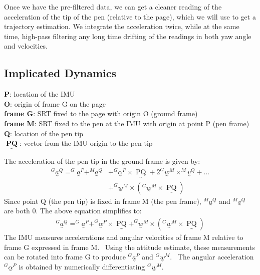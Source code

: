 \documentclass{article}
\newcommand{\nosymbol}{}
\newcommand{\tmop}[1]{\ensuremath{\operatorname{#1}}}
\begin{document}
Once we have the pre-filtered data, we can get a cleaner reading of the acceleration of the tip of the pen (relative to the page), which we will use to get a trajectory estimation. We integrate the acceleration twice, while at the same time, high-pass filtering any long time drifting of the readings in both yaw angle and velocities.


\subsection{Implicated Dynamics}
\textbf{P}: location of the IMU \\
\textbf{O}: origin of frame G on the page \\
\textbf{frame G}: SRT fixed to the page with origin O (ground frame) \\
\textbf{frame M}: SRT fixed to the pen at the IMU with origin at point P (pen frame) \\
\textbf{Q}: location of the pen tip \\
$\underset{\mbox{\textasciitilde}}{\tmop{\textbf{PQ}}}$: vector from the IMU origin to
the pen tip

The acceleration of the pen tip in the ground frame is given by:
\begin{align*}
  ^G \underset{\mbox{\textasciitilde}}{a}^Q =^G
  \underset{\mbox{\textasciitilde}}{a}^P +^M
  \underset{\mbox{\textasciitilde}}{a}^Q &+^G
  \underset{\mbox{\textasciitilde}}{\alpha}^P \times
  \underset{\mbox{\textasciitilde}}{\tmop{PQ}} + 2^G
  \underset{\mbox{\textasciitilde}}{w}^M \times^M
  \underset{\mbox{\textasciitilde}}{v}^Q + ... \\ &+ ^G 
  \underset{\mbox{\textasciitilde}}{w}^M \times \left(^G
  \underset{\mbox{\textasciitilde}}{w}^M \times
  \underset{\mbox{\textasciitilde}}{\tmop{PQ}} \right)
\end{align*}
Since point Q (the pen tip) is fixed in frame M (the pen frame), $^M
\underset{\mbox{\textasciitilde}}{a}^Q$ and $^M
\underset{\mbox{\textasciitilde}}{v}^Q$ are both 0. The above equation
simplifies to:
\begin{eqnarray*}
  & ^G \underset{\mbox{\textasciitilde}}{a}^Q =^G
  \underset{\mbox{\textasciitilde}}{a}^P +^G
  \underset{\mbox{\textasciitilde}}{\alpha}^P \times
  \underset{\mbox{\textasciitilde}}{\tmop{PQ}} +^G
  \underset{\mbox{\textasciitilde}}{w}^M \times \left(^G
  \underset{\mbox{\textasciitilde}}{w}^M \times
  \underset{\mbox{\textasciitilde}}{\tmop{PQ}} \right) & 
\end{eqnarray*}
The IMU measures accelerations and angular velocities of frame M relative to
frame G expressed in frame M. \ Using the attitude estimate, these
measurements can be rotated into frame G to produce $^G
\underset{\mbox{\textasciitilde}}{a}^P$ and $^G
\underset{\mbox{\textasciitilde}}{w}^M \nosymbol$. \ The angular acceleration
$^G \underset{\mbox{\textasciitilde}}{\alpha}^P$ is obtained by numerically
differentiating $^G \underset{\mbox{\textasciitilde}}{w}^M$.
\end{document}
